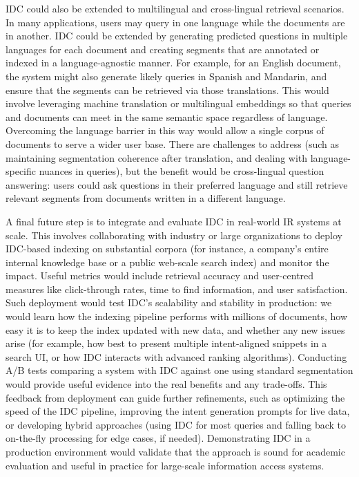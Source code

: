 \documentclass[12pt,a4paper]{report}
\begin{document}
IDC could also be extended to multilingual and cross-lingual retrieval scenarios. In many applications, users may query in one language while the documents are in another. IDC could be extended by generating predicted questions in multiple languages for each document and creating segments that are annotated or indexed in a language-agnostic manner. For example, for an English document, the system might also generate likely queries in Spanish and Mandarin, and ensure that the segments can be retrieved via those translations. This would involve leveraging machine translation or multilingual embeddings so that queries and documents can meet in the same semantic space regardless of language. Overcoming the language barrier in this way would allow a single corpus of documents to serve a wider user base. There are challenges to address (such as maintaining segmentation coherence after translation, and dealing with language-specific nuances in queries), but the benefit would be cross-lingual question answering: users could ask questions in their preferred language and still retrieve relevant segments from documents written in a different language.

A final future step is to integrate and evaluate IDC in real-world IR systems at scale. This involves collaborating with industry or large organizations to deploy IDC-based indexing on substantial corpora (for instance, a company's entire internal knowledge base or a public web-scale search index) and monitor the impact. Useful metrics would include retrieval accuracy and user-centred measures like click-through rates, time to find information, and user satisfaction. Such deployment would test IDC's scalability and stability in production: we would learn how the indexing pipeline performs with millions of documents, how easy it is to keep the index updated with new data, and whether any new issues arise (for example, how best to present multiple intent-aligned snippets in a search UI, or how IDC interacts with advanced ranking algorithms). Conducting A/B tests comparing a system with IDC against one using standard segmentation would provide useful evidence into the real benefits and any trade-offs. This feedback from deployment can guide further refinements, such as optimizing the speed of the IDC pipeline, improving the intent generation prompts for live data, or developing hybrid approaches (using IDC for most queries and falling back to on-the-fly processing for edge cases, if needed). Demonstrating IDC in a production environment would validate that the approach is sound for academic evaluation and useful in practice for large-scale information access systems.
\end{document}
